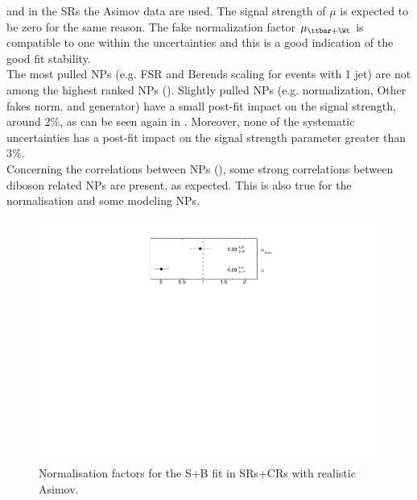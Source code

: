 and in the SRs the Asimov data are used. 
The signal strength of $\mu$ is expected to be zero for the same reason.
The fake normalization factor $\mu_{\ttbar+\Wt}$ is compatible to one within the uncertainties and
this is a good indication of the good fit stability.\\
The most pulled NPs (e.g. \ttbar FSR and \VVHF Berends scaling for events with 1 jet) are
not among the highest ranked NPs (). 
Slightly pulled NPs (e.g. \ttZ normalization, Other fakes norm. and \VVHF generator) have a small post-fit impact on the signal strength, around 2\%, as can be seen again in . Moreover, none of the systematic uncertainties has a post-fit impact on the signal strength parameter greater than 3\%.\\
Concerning the correlations between NPs
(), some strong correlations
between diboson related NPs are present, as expected. This is also
true for the \ttbar normalisation and some \ttbar modeling NPs. 

\begin{figure}[htbp]
	\centering
	\includegraphics[width=.5\textwidth]{Chapters/CH8/figures/SPLUSB_CRSR_UsingDL1rcFullSys/NormFactors}
	\caption{Normalisation factors for the S+B \tZc fit in SRs+CRs with realistic Asimov.}%
	\label{fig:stat:tzc:splusb:crsr:norm}
\end{figure}

